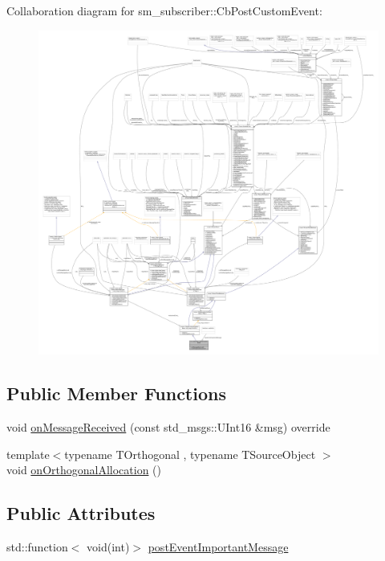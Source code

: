 Collaboration diagram for sm\+\_\+subscriber\+:\+:Cb\+Post\+Custom\+Event\+:
\nopagebreak
\begin{figure}[H]
\begin{center}
\leavevmode
\includegraphics[width=350pt]{classsm__subscriber_1_1CbPostCustomEvent__coll__graph}
\end{center}
\end{figure}
\subsection*{Public Member Functions}
\begin{DoxyCompactItemize}
\item 
void \hyperlink{classsm__subscriber_1_1CbPostCustomEvent_a662b32b373fe517ec7d773b68517c532}{on\+Message\+Received} (const std\+\_\+msgs\+::\+U\+Int16 \&msg) override
\item 
{\footnotesize template$<$typename T\+Orthogonal , typename T\+Source\+Object $>$ }\\void \hyperlink{classsm__subscriber_1_1CbPostCustomEvent_a7bfed2421f096e09355150a963b1b1f4}{on\+Orthogonal\+Allocation} ()
\end{DoxyCompactItemize}
\subsection*{Public Attributes}
\begin{DoxyCompactItemize}
\item 
std\+::function$<$ void(int)$>$ \hyperlink{classsm__subscriber_1_1CbPostCustomEvent_a671b613e1b9223a0d1cbe06782e28a06}{post\+Event\+Important\+Message}
\end{DoxyCompactItemize}

